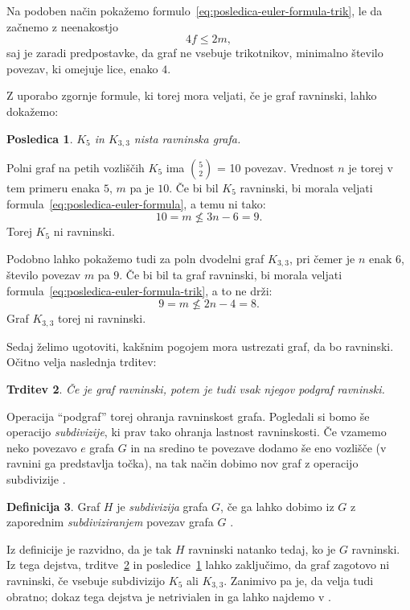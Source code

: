 \documentclass[12pt,a4paper]{amsart}
\theoremstyle{definition} %
\newtheorem{definicija}{Definicija}[section]
\theoremstyle{plain} %
\newtheorem{trditev}[definicija]{Trditev}
\newtheorem{posledica}[definicija]{Posledica}
\begin{document}
    Na podoben način pokažemo formulo~\eqref{eq:posledica-euler-formula-trik}, le da začnemo z neenakostjo 
    \[ 4f \leq 2m, \]
    saj je zaradi predpostavke, da graf ne vsebuje trikotnikov, minimalno število povezav, ki omejuje lice, enako $4$. 
\endproof

Z uporabo zgornje formule, ki torej mora veljati, če je graf ravninski, lahko dokažemo:
\begin{posledica}
    \label{posl:neravninska-grafa}
    $K_5$ in $K_{3,3}$ nista ravninska grafa.
\end{posledica}

\proof
    Polni graf na petih vozliščih $K_5$ ima {$5 \choose 2$} = 10 povezav. Vrednost $n$ je torej v tem primeru enaka
    $5$, $m$ pa je $10$. Če bi bil $K_5$ ravninski, bi morala veljati formula~\eqref{eq:posledica-euler-formula},
    a temu ni tako:
    \[ 10 = m \nleq 3n - 6 = 9. \]
    Torej $K_5$ ni ravninski.
    
    Podobno lahko pokažemo tudi za poln dvodelni graf $K_{3,3}$, pri čemer je $n$ enak $6$, število povezav $m$ pa $9$. Če bi bil ta graf ravninski, bi morala veljati formula~\eqref{eq:posledica-euler-formula-trik}, a to ne drži:
    \[ 9 = m \nleq 2n - 4 = 8. \] 
    Graf $K_{3,3}$ torej ni ravninski. \qedhere
\endproof

Sedaj želimo ugotoviti, kakšnim pogojem mora ustrezati graf, da bo ravninski. Očitno velja naslednja trditev:

\begin{trditev}
    \label{trd:podgraf}
    Če je graf ravninski, potem je tudi vsak njegov podgraf ravninski. %
\end{trditev}

Operacija ``podgraf'' torej ohranja ravninskost grafa.
Pogledali si bomo še operacijo \emph{subdivizije}, ki prav tako ohranja lastnost ravninskosti. Če vzamemo neko povezavo $e$ grafa $G$ in na sredino te povezave dodamo še eno vozlišče (v ravnini ga predstavlja točka), na tak način dobimo nov graf z operacijo subdivizije \cite[str.~66]{bib:potocnik}.

\begin{definicija}
    Graf $H$ je \emph{subdivizija} grafa $G$, če ga lahko dobimo iz $G$ z zaporednim \emph{subdiviziranjem} povezav grafa $G$ \cite[str.~66]{bib:potocnik}.
\end{definicija}

Iz definicije je razvidno, da je tak $H$ ravninski natanko tedaj, ko je $G$ ravninski. Iz tega dejstva, trditve~\ref{trd:podgraf} in posledice~\ref{posl:neravninska-grafa} lahko zaključimo, da graf zagotovo ni ravninski, če vsebuje subdivizijo $K_5$ ali $K_{3,3}$. Zanimivo pa je, da velja tudi obratno; dokaz tega dejstva je netrivialen in ga lahko najdemo v \cite[str.~247--251]{bib:west}.
\end{document}
